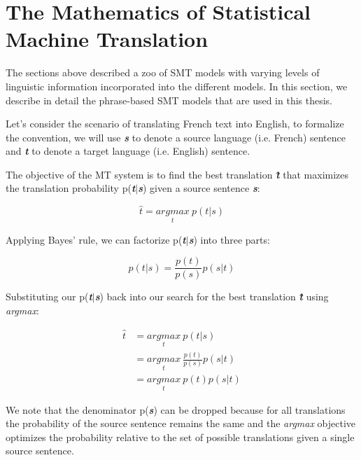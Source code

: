 \section{The Mathematics of Statistical Machine Translation}

The sections above described a zoo of SMT models with varying levels of linguistic information incorporated into the different models. In this section, we describe in detail the phrase-based SMT models that are used in this thesis. 

Let's consider the scenario of translating French text into English, to formalize the convention, we will use \emph{\textbf{s}} to denote a source language (i.e. French) sentence and \emph{\textbf{t}} to denote a target language (i.e. English) sentence. 

The objective of the MT system is to find the best translation \emph{\textbf{\^{t}}} that maximizes the translation probability p(\emph{\textbf{t}}${|}$\emph{\textbf{s}}) given a source sentence \emph{\textbf{s}}:

\begin{equation}
\hat { t } =\underset { t }{ argmax } \ p(t|s)
\end{equation}

\noindent Applying Bayes' rule, we can factorize p(\emph{\textbf{t}}${|}$\emph{\textbf{s}}) into three parts:

\begin{equation}
p(t|s)=\frac { p(t) }{ p(s) } p(s|t)
\end{equation}

\noindent Substituting our  p(\emph{\textbf{t}}${|}$\emph{\textbf{s}}) back into our search for the best translation \emph{\textbf{\^{t}}} using \emph{argmax}:

\begin{equation}
\begin{aligned}
\hat { t } &=\underset { t }{ argmax } \ p(t|s) \\
           &=\underset { t }{ argmax } \ \frac { p(t) }{ p(s) } p(s|t) \\
           &=\underset { t }{ argmax } \ p(t) p(s|t)
\end{aligned}
\end{equation}

We note that the denominator p(\emph{\textbf{s}}) can be dropped because for all translations the probability of the source sentence remains the same and the \emph{argmax} objective optimizes the probability relative to the set of possible translations given a single source sentence. 

